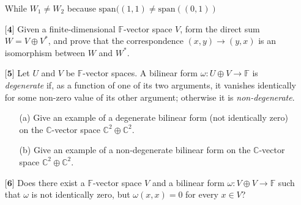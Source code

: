 \documentclass[12pt]{article}
\begin{document}
\begin{itemize}
        While $W_1 \neq W_2$ because $\text{span}((1,1) \neq \text{span}((0,1))$

    
    
    \vspace{.5cm}
    \item[$\textbf{[4]}$]
    Given a finite-dimensional $\mathbb{F}$-vector space $V$, form the direct sum $W = V \oplus V^*$, and prove that the correspondence $(x,y) \rightarrow (y,x)$ is an isomorphism between $W$ and $W^*$. 
    
    \vspace{.5cm}
    \item[$\textbf{[5]}$]
    Let $U$ and $V$ be $\mathbb{F}$-vector spaces. A bilinear form $\omega: U \oplus V \rightarrow \mathbb{F}$ is \textit{degenerate} if, as a function of one of its two arguments, it vanishes identically for some non-zero value of its other argument; otherwise it is \textit{non-degenerate}.
    \begin{itemize}
    
    \vspace{.3cm}
    \item[(a)]
    Give an example of a degenerate bilinear form (not identically zero) on the $\mathbb{C}$-vector space $\mathbb{C}^2 \oplus \mathbb{C}^2$.
    
    \vspace{.3cm}
    \item[(b)]
    Give an example of a non-degenerate bilinear form on the $\mathbb{C}$-vector space $\mathbb{C}^2 \oplus \mathbb{C}^2$.  
    
    \end{itemize}
    
    \vspace{.5cm}
    \item[$\textbf{[6]}$]
    Does there exist a $\mathbb{F}$-vector space $V$ and a bilinear form $\omega: V \oplus V \rightarrow \mathbb{F}$ such that $\omega$ is not identically zero, but $\omega(x,x) = 0$ for every $x \in V$?
    

\end{itemize}
\end{document}
